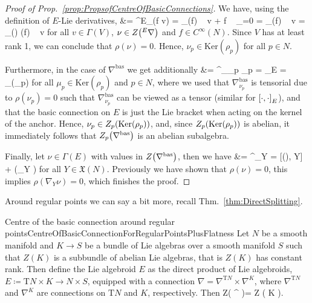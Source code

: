 \begin{proof}[Proof of Prop.~\ref{prop:PropsofCentreOfBasicConnections}]
\leavevmode\newline
We have, using the definition of $E$-Lie derivatives,
&=
{}^E\nabla_\nu (f v)
=
_\nu (f) ~ v
	+ f ~ _{=0}
=
_\nu (f) ~ v
=
_{\rho(\nu)} (f) ~ v
\eas
for all $v \in \Gamma(V)$, $\nu \in Z \mleft( {}^E\nabla \mright)$ and $f \in C^\infty(N)$. Since $V$ has at least rank 1, we can conclude that $\rho(\nu) = 0$. Hence, $\nu_p \in \mathrm{Ker}(\rho_p)$ for all $p \in N$. 

Furthermore, in the case of $\nabla^{\mathrm{bas}}$ we get additionally
&=
\nabla^{}_{\nu_p} \mu_p
=
\mleft[ \nu_p, \mu_p \mright]_E
=
\mleft[ \nu_p, \mu_p \mright]_{(\rho_p)}
\eas
for all $\mu_p \in \mathrm{Ker}(\rho_p)$ and $p \in N$, where we used that $\nabla^{\mathrm{bas}}_{\nu_p}$ is tensorial due to $\rho(\nu_p)=0$ such that $\nabla^{\mathrm{bas}}_{\nu_p}$ can be viewed as a tensor (similar for $\mleft[ \cdot, \cdot \mright]_E$), and that the basic connection on $E$ is just the Lie bracket when acting on the kernel of the anchor. Hence, $\nu_p \in Z_p \mleft( \mathrm{Ker}(\rho_p) \mright)$, and, since $Z_p \mleft( \mathrm{Ker}(\rho_p) \mright)$ is abelian, it immediately follows that $Z_p\mleft(\nabla^{\mathrm{bas}}\mright)$ is an abelian subalgebra.

Finally, let $\nu \in \Gamma(E)$ with values in $Z\mleft( \nabla^{\mathrm{bas}} \mright)$, then we have
&=
\nabla^{}_\nu Y
=
[\rho(\nu), Y]
	+ \rho(\nabla_Y \nu)
\eas
for all $Y \in \mathfrak{X}(N)$. Previously we have shown that $\rho(\nu) = 0$, this implies $\rho(\nabla_Y \nu) = 0$, which finishes the proof.
\end{proof}

Around regular points we can say a bit more, recall Thm.~\ref{thm:DirectSplitting}.

\begin{lemmata}{Centre of the basic connection around regular points}{CentreOfBasicConnectionForRegularPointsPlusFlatness}
Let $N$ be a smooth manifold and $K \to S$ be a bundle of Lie algebras over a smooth manifold $S$ such that $Z(K)$ is a subbundle of abelian Lie algebras, that is $Z(K)$ has constant rank. Then define the Lie algebroid $E$ as the direct product of Lie algebroids, $E \coloneqq \mathrm{T}N \times K \to N \times S$, equipped with a connection $\nabla = \nabla^{\mathrm{T}N} \times \nabla^K$, where $\nabla^{\mathrm{T}N}$ and $\nabla^K$ are connections on $\mathrm{T}N$ and $K$, respectively.
Then
\ba
Z\mleft( \nabla^{} \mright)= Z \mleft( K \mright).
\ea
\end{lemmata}

